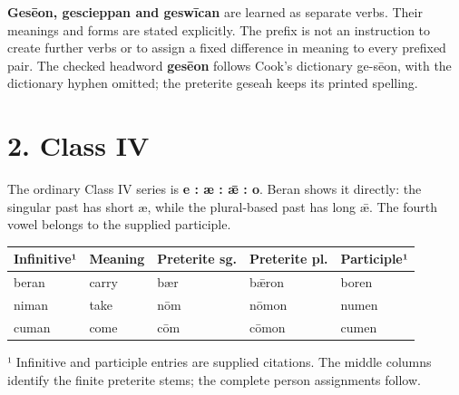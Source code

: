 \textbf{Gesēon, gescieppan and geswīcan} are learned as separate verbs. Their meanings and forms are stated explicitly. The prefix is not an instruction to create further verbs or to assign a fixed difference in meaning to every prefixed pair. The checked headword \textbf{gesēon} follows Cook’s dictionary ge-sēon, with the dictionary hyphen omitted; the preterite geseah keeps its printed spelling.

\section*{2. Class IV}

The ordinary Class IV series is \textbf{e : æ : ǣ : o}. Beran shows it directly: the singular past has short æ, while the plural-based past has long ǣ. The fourth vowel belongs to the supplied participle.

\par\begingroup
\fontsize{10.5}{13.2}\selectfont
\setlength{\LTleft}{0pt}\setlength{\LTright}{\fill}
\noindent
\begin{tabular}{@{}>{\raggedright\arraybackslash}p{23.14mm}>{\raggedright\arraybackslash}p{21.04mm}>{\raggedright\arraybackslash}p{22.72mm}>{\raggedright\arraybackslash}p{22.72mm}>{\raggedright\arraybackslash}p{23.14mm}@{}}
\toprule
\textbf{Infinitive¹} & \textbf{Meaning} & \textbf{Preterite sg.} & \textbf{Preterite pl.} & \textbf{Participle¹} \\
\midrule
beran & carry & bær & bǣron & boren \\
niman & take & nōm & nōmon & numen \\
cuman & come & cōm & cōmon & cumen \\
\bottomrule
\end{tabular}
\par\endgroup

¹ Infinitive and participle entries are supplied citations. The middle columns identify the finite preterite stems; the complete person assignments follow.

